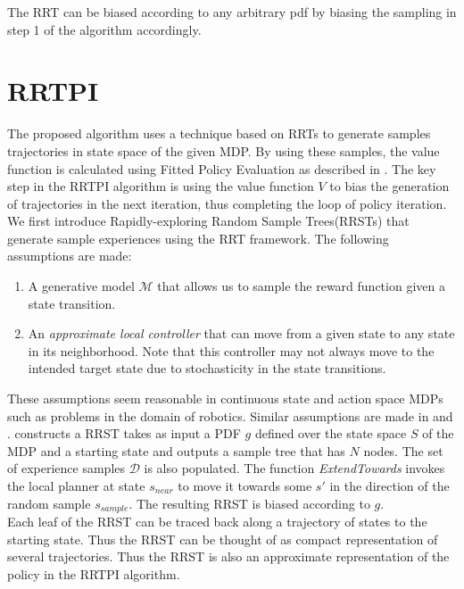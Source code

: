 \documentclass[wcp]{jmlr}
\begin{document}
The RRT can be biased according to any arbitrary pdf by biasing the sampling in step 1 of the algorithm accordingly. 

\section{RRTPI}
\label{sec:rrtpi}
The proposed algorithm uses a technique based on RRTs to generate samples trajectories in state space of the given MDP. By using these samples, the value function is calculated using Fitted Policy Evaluation as described in . The key step in the RRTPI algorithm is using the value function $V$ to bias the generation of trajectories in the next iteration, thus completing the loop of policy iteration.
We first introduce Rapidly-exploring Random Sample Trees(RRSTs) that generate sample experiences using the RRT framework. The following assumptions are made:
\begin{enumerate}
\item A generative model $\mathcal{M}$ that allows us to sample the reward function given a state transition.
\item An \textit{approximate local controller} that can move from a given state to any state in its neighborhood. Note that this controller may not always move to the intended target state due to stochasticity in the state transitions.
\end{enumerate}

These assumptions seem reasonable in continuous state and action space MDPs such as problems in the domain of robotics. Similar assumptions are made in \citep{partigame} and \citep{pegasus}.  constructs a RRST takes as input a PDF $ g $  defined over the state space $S$ of the MDP and a starting state and outputs a sample tree that has $N$ nodes. The set of experience samples $\mathcal{D}$ is also populated. The function \textit{ExtendTowards} invokes the local planner at state $s_{near}$ to move it towards some $s'$ in the direction of the random sample $s_{sample}$. The resulting RRST is biased according to $g$.\\
Each leaf of the RRST can be traced back along a trajectory of states to the starting state. Thus the RRST can be thought of as compact representation of several trajectories. Thus the RRST is also an approximate representation of the policy in the RRTPI algorithm.\\
\end{document}
